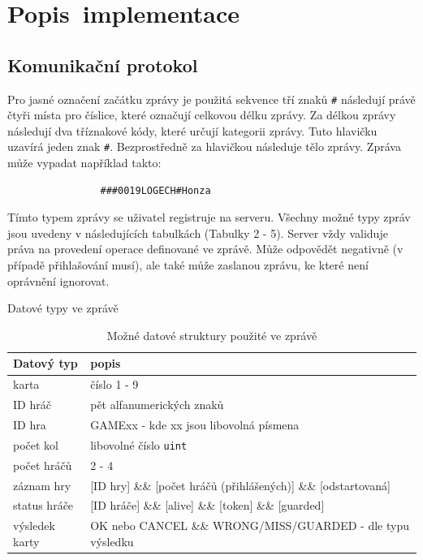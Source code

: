 \documentclass[12pt, a4paper]{article}
\begin{document}
\section{Popis~implementace} %


\subsection{Komunikační protokol}

Pro jasné označení začátku zprávy je použitá sekvence tří znaků \texttt{\#} následují právě čtyři místa pro číslice, které označují celkovou délku zprávy. Za délkou zprávy následují dva tříznakové kódy, které určují kategorii zprávy. Tuto hlavičku uzavírá jeden znak \texttt{\#}. Bezprostředně za hlavičkou následuje tělo zprávy. Zpráva může vypadat například takto:

\begin{verbatim}
                ###0019LOGECH#Honza
\end{verbatim}

Tímto typem zprávy se uživatel registruje na serveru. Všechny možné typy zpráv jsou uvedeny v následujících tabulkách (Tabulky 2 - 5). Server vždy validuje práva na provedení operace definované ve zprávě. Může odpovědět negativně (v případě přihlašování musí), ale také může zaslanou zprávu, ke které není oprávnění ignorovat.

\begin{table}[H]%
\centering
Datové typy ve zprávě
\begin{tabular}{| p{3cm} | p{10cm} |}
\hline
Datový typ &  popis\\
\hline
karta & číslo 1 - 9 \\
\hline
ID hráč & pět alfanumerických znaků\\
\hline
ID hra & GAMExx - kde xx jsou libovolná písmena \\
\hline
počet kol & libovolné číslo \texttt{uint}  \\
\hline
počet hráčů & 2 - 4 \\
\hline
záznam hry & [ID hry]    \&\&    [počet hráčů (přihlášených)]    \&\&    [odstartovaná] \\
\hline
status hráče & [ID hráče]    \&\&    [alive]    \&\&   [token]    \&\&    [guarded]  \\
\hline
výsledek karty & OK nebo CANCEL \&\& WRONG/MISS/GUARDED - dle typu výsledku\\
\hline
\end{tabular}
\label{tab:zpravyDatTypy}
\caption{Možné datové struktury použité ve zprávě}
\end{table}
\end{document}
